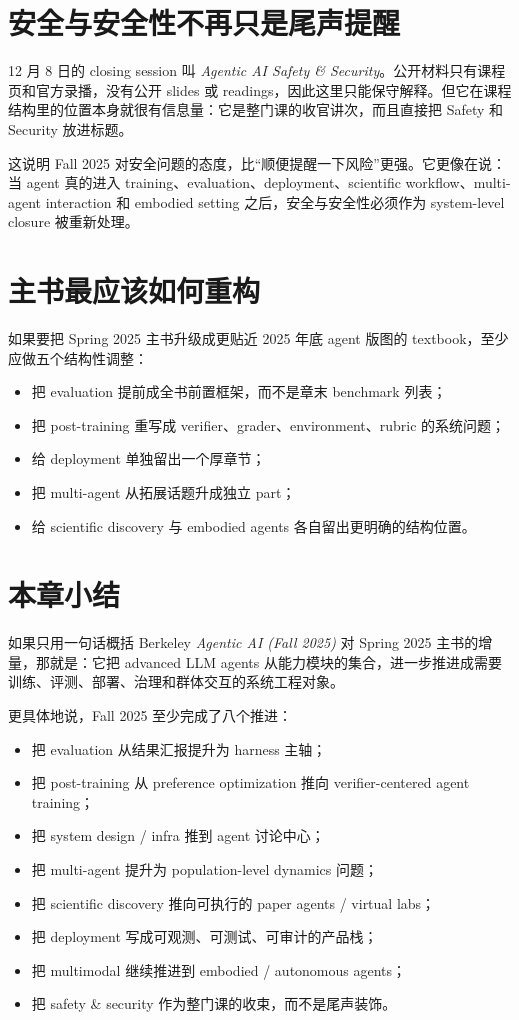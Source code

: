 \documentclass[11pt]{ctexbook}
\begin{document}
\section{安全与安全性不再只是尾声提醒}

12 月 8 日的 closing session 叫 \emph{Agentic AI Safety \& Security}。公开材料只有课程页和官方录播，没有公开 slides 或 readings，因此这里只能保守解释。但它在课程结构里的位置本身就很有信息量：它是整门课的收官讲次，而且直接把 Safety 和 Security 放进标题。

这说明 Fall 2025 对安全问题的态度，比“顺便提醒一下风险”更强。它更像在说：当 agent 真的进入 training、evaluation、deployment、scientific workflow、multi-agent interaction 和 embodied setting 之后，安全与安全性必须作为 system-level closure 被重新处理。

\section{主书最应该如何重构}

如果要把 Spring 2025 主书升级成更贴近 2025 年底 agent 版图的 textbook，至少应做五个结构性调整：

\begin{itemize}
\item 把 evaluation 提前成全书前置框架，而不是章末 benchmark 列表；
\item 把 post-training 重写成 verifier、grader、environment、rubric 的系统问题；
\item 给 deployment 单独留出一个厚章节；
\item 把 multi-agent 从拓展话题升成独立 part；
\item 给 scientific discovery 与 embodied agents 各自留出更明确的结构位置。
\end{itemize}

\section{本章小结}

如果只用一句话概括 Berkeley \emph{Agentic AI (Fall 2025)} 对 Spring 2025 主书的增量，那就是：它把 advanced LLM agents 从能力模块的集合，进一步推进成需要训练、评测、部署、治理和群体交互的系统工程对象。

更具体地说，Fall 2025 至少完成了八个推进：

\begin{itemize}
\item 把 evaluation 从结果汇报提升为 harness 主轴；
\item 把 post-training 从 preference optimization 推向 verifier-centered agent training；
\item 把 system design / infra 推到 agent 讨论中心；
\item 把 multi-agent 提升为 population-level dynamics 问题；
\item 把 scientific discovery 推向可执行的 paper agents / virtual labs；
\item 把 deployment 写成可观测、可测试、可审计的产品栈；
\item 把 multimodal 继续推进到 embodied / autonomous agents；
\item 把 safety \& security 作为整门课的收束，而不是尾声装饰。
\end{itemize}
\end{document}

